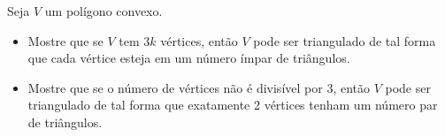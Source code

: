 Seja \(V\) um polígono convexo.\begin{itemize}

\item[(a)] Mostre que se \(V\) tem \(3k\) vértices, então \(V\) pode ser triangulado de tal forma que cada vértice esteja em um número ímpar de triângulos.
\item[(b)] Mostre que se o número de vértices não é divisível por 3, então \(V\) pode ser triangulado de tal forma que exatamente 2 vértices tenham um número par de triângulos.
\end{itemize}
